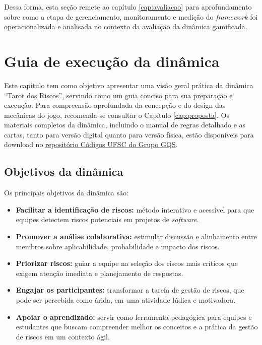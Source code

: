 \documentclass[
	12pt,
	openright,
	twoside,
	a4paper,
	english,
	brazil
	]{abntex2}
\begin{document}
Dessa forma, esta seção remete ao capítulo \ref{cap:avaliacao} para aprofundamento sobre como a etapa de gerenciamento, monitoramento e medição do \textit{framework} foi operacionalizada e analisada no contexto da avaliação da dinâmica gamificada. 


\chapter{Guia de execução da dinâmica}
\label{cap:dinamica-execucao}

Este capítulo tem como objetivo apresentar uma visão geral prática da dinâmica “Tarot dos Riscos”, servindo como um guia conciso para sua preparação e execução. Para compreensão aprofundada da concepção e do design das mecânicas do jogo, recomenda-se consultar o Capítulo \ref{cap:proposta}. Os materiais completos da dinâmica, incluindo o manual de regras detalhado e as cartas, tanto para versão digital quanto para versão física, estão disponíveis para download no \href{https://codigos.ufsc.br/gqs/tarot-dos-riscos}{repositório Códigos UFSC do Grupo GQS}.

\section{Objetivos da dinâmica}
\label{sec:objetivos-dinamica-cap5}

Os principais objetivos da dinâmica são:

\begin{itemize}
\item \textbf{Facilitar a identificação de riscos:} método interativo e acessível para que equipes detectem riscos potenciais em projetos de \textit{software}.
\item \textbf{Promover a análise colaborativa:} estimular discussão e alinhamento entre membros sobre aplicabilidade, probabilidade e impacto dos riscos.
\item \textbf{Priorizar riscos:} guiar a equipe na seleção dos riscos mais críticos que exigem atenção imediata e planejamento de respostas.
\item \textbf{Engajar os participantes:} transformar a tarefa de gestão de riscos, que pode ser percebida como árida, em uma atividade lúdica e motivadora.
\item \textbf{Apoiar o aprendizado:} servir como ferramenta pedagógica para equipes e estudantes que buscam compreender melhor os conceitos e a prática da gestão de riscos em um contexto ágil.
\end{itemize}
\end{document}
